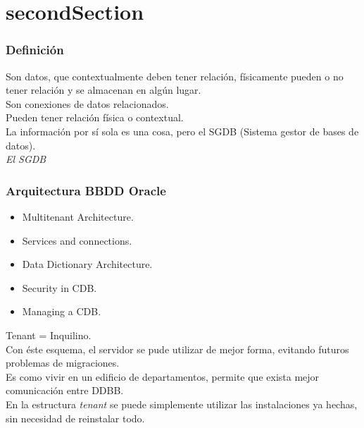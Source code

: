 \newpage
\part{\acrlong{secondSection}}
\section{Definici\'{o}n}
Son datos, que contextualmente deben tener relaci\'{o}n, f\'{i}sicamente pueden o no tener relaci\'{o}n y se almacenan en alg\'{u}n lugar.\\
Son conexiones de datos relacionados.\\
Pueden tener relaci\'{o}n f\'{i}sica o contextual.\\
La informaci\'{o}n por s\'{i} sola es una cosa, pero el SGDB (Sistema gestor de bases de datos).\\
\textit{El SGDB}

\section{Arquitectura BBDD Oracle}
\begin{itemize}
	\item Multitenant Architecture.
	\item Services and connections.
	\item Data Dictionary Architecture.
	\item Security in CDB.
	\item Managing a CDB.
\end{itemize}
Tenant = Inquilino.\\
Con \'{e}ste esquema, el servidor se pude utilizar de mejor forma, evitando futuros problemas de migraciones.\\
Es como vivir en un edificio de departamentos, permite que exista mejor comunicaci\'{o}n entre DDBB.\\
En la estructura \textit{tenant} se puede simplemente utilizar las instalaciones ya hechas, sin necesidad de reinstalar todo.\\

